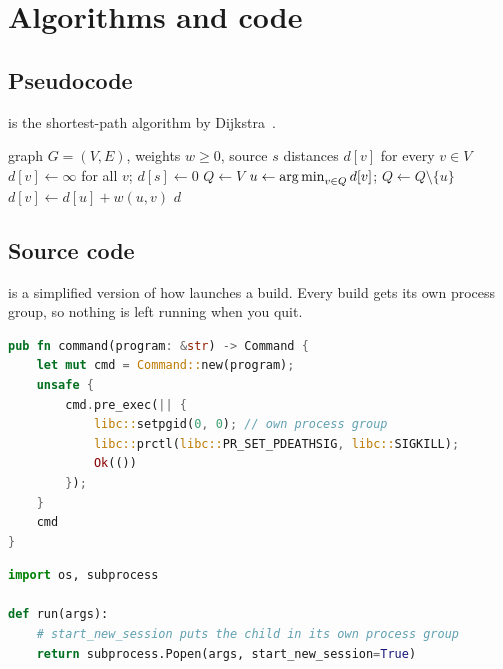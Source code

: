 \chapter{Algorithms and code}
\label{chap:algorithms}

\section{Pseudocode}

 is the shortest-path algorithm by Dijkstra~\cite{dijkstra1959}.

\begin{algorithm}[htbp]
  \caption{Dijkstra's shortest paths}
  \label{alg:dijkstra}
  \begin{algorithmic}[1]
    \Require graph $G=(V,E)$, weights $w \ge 0$, source $s$
    \Ensure distances $d[v]$ for every $v \in V$
    \State $d[v] \gets \infty$ for all $v$; \quad $d[s] \gets 0$
    \State $Q \gets V$
      \State $u \gets \operatorname*{arg\,min}_{v \in Q} d[v]$; \quad $Q \gets Q \setminus \{u\}$
          \State $d[v] \gets d[u] + w(u,v)$
        \EndIf
      \EndFor
    \EndWhile
    \State \Return $d$
  \end{algorithmic}
\end{algorithm}

\section{Source code}

 is a simplified version of how \rutex{} launches a build. Every
build gets its own process group, so nothing is left running when you quit.

\begin{lstlisting}[language=Rust, caption={Spawning latexmk without leaving orphans.}, label={lst:rust}]
pub fn command(program: &str) -> Command {
    let mut cmd = Command::new(program);
    unsafe {
        cmd.pre_exec(|| {
            libc::setpgid(0, 0); // own process group
            libc::prctl(libc::PR_SET_PDEATHSIG, libc::SIGKILL);
            Ok(())
        });
    }
    cmd
}
\end{lstlisting}

\begin{lstlisting}[language=Python, caption={The same idea in Python.}, label={lst:python}]
import os, subprocess

def run(args):
    # start_new_session puts the child in its own process group
    return subprocess.Popen(args, start_new_session=True)
\end{lstlisting}
